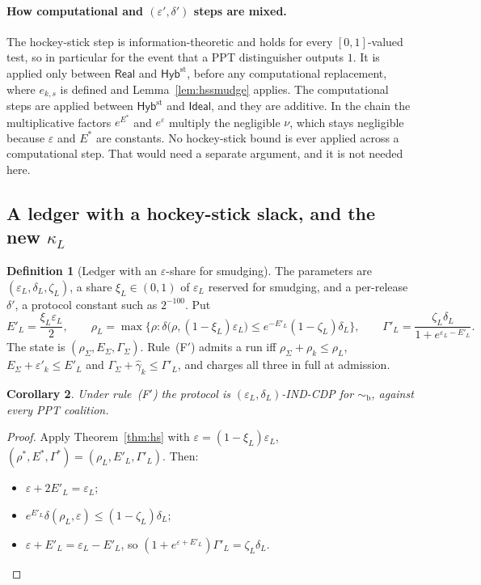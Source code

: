 \documentclass[11pt]{article}
\theoremstyle{definition}
\newtheorem{definition}{Definition}[section]
\theoremstyle{plain}
\newtheorem{corollary}[definition]{Corollary}
\newcommand{\Real}{\mathsf{Real}}
\newcommand{\Hyb}{\mathsf{Hyb}}
\newcommand{\Ideal}{\mathsf{Ideal}}
\newcommand{\simb}{\sim_{\mathrm b}}
\begin{document}
\paragraph{How computational and $(\varepsilon',\delta')$ steps are mixed.} The hockey-stick step is information-theoretic and holds for every $[0,1]$-valued test, so in particular for the event that a PPT distinguisher outputs $1$. It is applied only between $\Real$ and $\Hyb^{\mathrm{st}}$, before any computational replacement, where $e_{k,s}$ is defined and Lemma~\ref{lem:hssmudge} applies. The computational steps are applied between $\Hyb^{\mathrm{st}}$ and $\Ideal$, and they are additive. In the chain the multiplicative factors $e^{E^*}$ and $e^\varepsilon$ multiply the negligible $\nu$, which stays negligible because $\varepsilon$ and $E^*$ are constants. No hockey-stick bound is ever applied across a computational step. That would need a separate argument, and it is not needed here.

\subsection{\texorpdfstring{A ledger with a hockey-stick slack, and the new $\kappa_L$}{A ledger with a hockey-stick slack, and the new kappa-L}}

\begin{definition}[Ledger with an $\varepsilon$-share for smudging]\label{def:ledgerhs}
The parameters are $(\varepsilon_L,\delta_L,\zeta_L)$, a share $\xi_L\in(0,1)$ of $\varepsilon_L$ reserved for smudging, and a per-release $\delta'$, a protocol constant such as $2^{-100}$. Put
\[
  E'_L=\frac{\xi_L\varepsilon_L}2,\qquad
  \rho_L=\max\bigl\{\rho:\delta\bigl(\rho,(1-\xi_L)\varepsilon_L\bigr)\le e^{-E'_L}(1-\zeta_L)\delta_L\bigr\},\qquad
  \Gamma'_L=\frac{\zeta_L\delta_L}{1+e^{\varepsilon_L-E'_L}} .
\]
The state is $(\rho_\Sigma,E_\Sigma,\Gamma_\Sigma)$. Rule~(F$'$) admits a run iff $\rho_\Sigma+\rho_k\le\rho_L$, $E_\Sigma+\varepsilon'_k\le E'_L$ and $\Gamma_\Sigma+\hat\gamma_k\le\Gamma'_L$, and charges all three in full at admission.
\end{definition}

\begin{corollary}\label{cor:ledgerhs}
Under rule~(F$'$) the protocol is $(\varepsilon_L,\delta_L)$-IND-CDP for $\simb$, against every PPT coalition.
\end{corollary}
\begin{proof}
Apply Theorem~\ref{thm:hs} with $\varepsilon=(1-\xi_L)\varepsilon_L$, $(\rho^*,E^*,\Gamma^*)=(\rho_L,E'_L,\Gamma'_L)$. Then:
\begin{itemize}[nosep]
  \item $\varepsilon+2E'_L=\varepsilon_L$;
  \item $e^{E'_L}\delta(\rho_L,\varepsilon)\le(1-\zeta_L)\delta_L$;
  \item $\varepsilon+E'_L=\varepsilon_L-E'_L$, so $(1+e^{\varepsilon+E'_L})\Gamma'_L=\zeta_L\delta_L$.
\end{itemize}
\end{proof}
\end{document}
